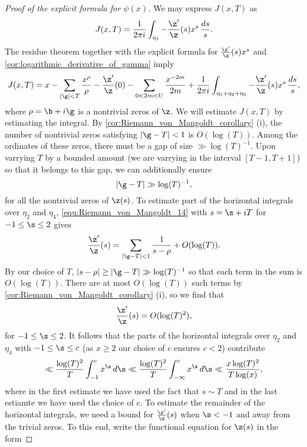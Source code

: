 \begin{proof}[Proof of the explicit formula for $\psi(x)$]
        We may express $J(x,T)$ as
        \[
          J(x,T) = \frac{1}{2\pi i}\int_{\eta_{1}}-\frac{\z'}{\z}(s)x^{s}\,\frac{ds}{s}.
        \]
        The residue theorem together with the explicit formula for $\frac{\z'}{\z}(s)x^{s}$ and \cref{cor:logarithmic_derivative_of_gamma} imply
        \begin{equation}\label{equ:explicit_formula_proof_7}
          J(x,T) = x-\sum_{|\g| < T}\frac{x^{\rho}}{\rho}-\frac{\z'}{\z}(0)-\sum_{0 < 2m < U}\frac{x^{-2m}}{2m}+\frac{1}{2\pi i}\int_{\eta_{1}+\eta_{2}+\eta_{3}}-\frac{\z'}{\z}(s)x^{s}\,\frac{ds}{s},
        \end{equation}
        where $\rho = \b+i\g$ is a nontrivial zeros of $\z$. We will estimate $J(x,T)$ by estimating the integral. By \cref{cor:Riemann_von_Mangoldt_corollary} (i), the number of nontrivial zeros satisfying $|\g-T| < 1$ is $O(\log(T))$. Among the ordinates of these zeros, there must be a gap of size $\gg \log(T)^{-1}$. Upon varrying $T$ by a bounded amount (we are varrying in the interval $[T-1,T+1]$) so that it belongs to this gap, we can additionally ensure
        \[
          |\g-T| \gg \log(T)^{-1},
        \]
        for all the nontrivial zeros of $\z(s)$. To estimate part of the horizontal integrals over $\eta_{2}$ and $\eta_{4}$, \cref{equ:Riemann_von_Mangoldt_14} with $s = \s+iT$ for $-1 \le \s \le 2$ gives
        \[
          \frac{\z'}{\z}(s) = \sum_{|\g-T| < 1}\frac{1}{s-\rho}+O(\log(T)).
        \]
        By our choice of $T$, $|s-\rho| \ge |\g-T| \gg \log(T)^{-1}$ so that each term in the sum is $O(\log(T))$. There are at most $O(\log(T))$ such terms by \cref{cor:Riemann_von_Mangoldt_corollary} (i), so we find that
        \[
          \frac{\z'}{\z}(s) = O(\log(T)^{2}),
        \]
        for $-1 \le \s \le 2$. It follows that the parts of the horizontal integrals over $\eta_{2}$ and $\eta_{4}$ with  $-1 \le \s \le c$ (as $x \ge 2$ our choice of $c$ ensures $c < 2$) contribute
        \begin{equation}\label{equ:explicit_formula_proof_8}
          \ll \frac{\log(T)^{2}}{T}\int_{-1}^{c}x^{\s}\,d\s \ll \frac{\log(T)^{2}}{T}\int_{-\infty}^{c}x^{\s}\,d\s \ll \frac{x\log(T)^{2}}{T\log(x)},
        \end{equation}
        where in the first estimate we have used the fact that $s \sim T$ and in the last estiamte we have used the choice of $c$. To estimate the remainder of the horizontal integrals, we need a bound for $\frac{\z'}{\z}(s)$ when $\s < -1$ and away from the trivial zeros. To this end, write the functional equation for $\z(s)$ in the form

\end{proof}
